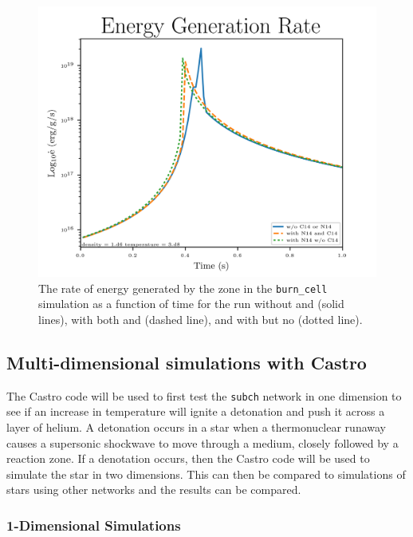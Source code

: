 \documentclass[preprint]{aastex62}
\begin{document}
      \begin{figure}
        \centering
        \includegraphics[width=5in]{images/subch_nC14nN14_edot_tol-10.png}
        \caption{The rate of energy generated by the zone in the {\tt burn\_cell} simulation as a function of time for the run without  and  (solid lines), with both  and  (dashed line), and with  but no  (dotted line).
          }
        \label{fig:energygeneration}
      \end{figure} 

  \newpage
  
  \subsection{Multi-dimensional simulations with Castro}
  
    The Castro code will be used to first test the {\tt subch} network in one dimension to see if an increase in temperature will ignite a detonation and push it across a layer of helium. A detonation occurs in a star when a thermonuclear runaway causes a supersonic shockwave to move through a medium, closely followed by a reaction zone. If a denotation occurs, then the Castro code will be used to simulate the star in two dimensions. This can then be compared to simulations of stars using other networks and the results can be compared. 
    
    \subsubsection{1-Dimensional Simulations}
    
\end{document}
